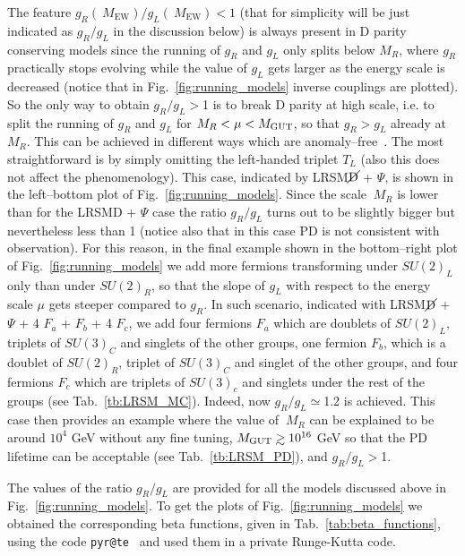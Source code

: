 \documentclass[11pt]{article}
\newcommand{\MEW}{\:M_{\text{EW}}}
\newcommand{\MR}{\:M_{R}}
\newcommand{\Figref}[1]{Fig.~\ref{#1}}
\newcommand{\Tabref}[1]{Tab.~\ref{#1}}
\newcommand{\gsim}{\mathrel{\mathop{\kern 0pt
      \rlap{\raise.2ex\hbox{$>$}}}\lower.9ex\hbox{\kern-.190em $\sim$}}}
\begin{document}
The feature $g_R(\MEW)/g_L(\MEW)<1$ (that for simplicity will be just indicated as $g_R/g_L$ in the discussion below) is always present in D parity conserving models since the running of $g_R$ and $g_L$ only splits below $M_R$, where $g_R$ practically stops evolving while the value of $g_L$ gets larger as the energy scale is decreased (notice that in Fig.~\ref{fig:running_models} inverse couplings are plotted). 
So the only way to obtain $g_R/g_L>$1 is to break D parity at high scale, i.e. to split the running of $g_R$ and $g_L$ for $M_R<\mu<M_{\rm GUT}$, so that $g_R>g_L$ already at $M_R$. This can be achieved in different ways which are anomaly--free~\cite{Lindner:1996tf}. The most straightforward is by simply omitting the left-handed triplet $T_L$ \cite{gr_gl_perturbativity} (also this does not affect the phenomenology).
This case, indicated by LRSM$\cancel{\rm D}$ + $\Psi$, is shown in the left--bottom plot of \Figref{fig:running_models}. Since the scale $\MR$ is lower than for the LRSMD + $\Psi$ case the ratio $g_R/g_L$ turns out to be slightly bigger but nevertheless less than 1 (notice also that in this case PD is not consistent with observation). For this reason, in the final example shown in the bottom--right plot of Fig.~\ref{fig:running_models} we add more fermions transforming under $SU(2)_L$ only than under $SU(2)_R$, so that the slope of $g_L$ with respect to the energy scale $\mu$ gets steeper compared to $g_R$. In such scenario, indicated with 
LRSM$\cancel{\rm D}$ + $\Psi$ + 4 $F_a$ + $F_b$ + 4 $F_c$,  we add four fermions $F_a$ which are doublets of $SU(2)_L$, triplets of $SU(3)_C$ and singlets of the other groups, one fermion $F_b$, which is a doublet of $SU(2)_R$, triplet of $SU(3)_C$ and singlet of the other groups, and four fermions $F_c$ which are triplets of $SU(3)_c$ and singlets under the rest of the groups (see Tab.~\ref{tb:LRSM_MC}). Indeed, now $g_R/g_L\simeq$1.2 is achieved. This case then provides an example where the value of $\MR$ can be explained to be around $10^4$ GeV without any fine tuning,  $M_{\rm GUT}\gsim 10^{16}$ GeV so that the PD lifetime can be acceptable (see \Tabref{tb:LRSM_PD}), and $g_R/g_L>$1. 

The values of the ratio $g_R/g_L$ are provided for all the models discussed above in \Figref{fig:running_models}. 
To get the plots of Fig.~\ref{fig:running_models} we obtained the corresponding beta functions, given in Tab.~\ref{tab:beta_functions}, using the code \verb|pyr@te|~\cite{pyr@te} and used them in a private Runge-Kutta code.
\end{document}
